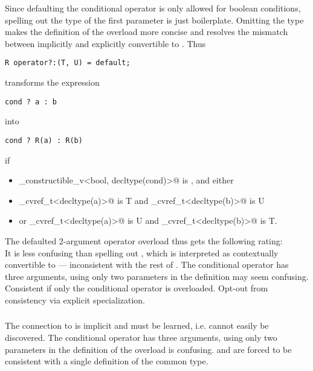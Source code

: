 Since defaulting the conditional operator is only allowed for boolean conditions, spelling out the type of the first parameter is just boilerplate.
Omitting the type makes the definition of the overload more concise and resolves the mismatch between implicitly and explicitly convertible to \bool.
Thus
\medskip\begin{lstlisting}[style=Vc]
R operator?:(T, U) = default;
\end{lstlisting}
transforms the expression
\medskip\begin{lstlisting}[style=Vc]
cond ? a : b
\end{lstlisting}
into
\medskip\begin{lstlisting}[style=Vc]
cond ? R(a) : R(b)
\end{lstlisting}
if
\begin{itemize}
\item \lstinline@is_constructible_v<bool, decltype(cond)>@ is \true, and either
\item \lstinline@remove_cvref_t<decltype(a)>@ is \type T and \lstinline@remove_cvref_t<decltype(b)>@ is \type U
\item or \lstinline@remove_cvref_t<decltype(a)>@ is \type U and \lstinline@remove_cvref_t<decltype(b)>@ is \type T.
\end{itemize}

The defaulted 2-argument operator overload thus gets the following rating:\\
\greatnesstable
{\good}
{\good It is less confusing than spelling out \bool, which is interpreted as contextually convertible to \bool --- inconsistent with the rest of \CC{}.\newline
  \undecided The conditional operator has three arguments, using only two parameters in the definition may seem confusing.}
{\good}
{\good}
{\undecided Consistent if only the conditional operator is overloaded. Opt-out from consistency via explicit  specialization.}

\subsubsection{}\label{sec:no return type}

\greatnesstable
{\good}
{\bad The connection to  is implicit and must be learned, i.e. cannot easily be discovered.
  The conditional operator has three arguments, using only two parameters in the definition of the overload is confusing.}
{\good}
{\good}
{\good {} and  are forced to be consistent with a single definition of the common type.}

